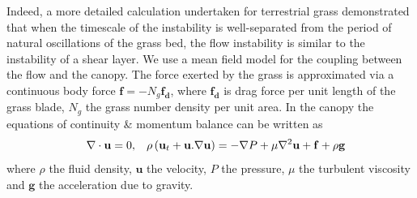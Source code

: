 \documentclass[aps,prl,twocolumn,superscriptaddress,10pt]{revtex4-1}  %
\newcommand{\bu}{\mathbf{u}}
\newcommand{\grad}{\mathbf{\nabla}}
\newcommand{\Rey}{\text{R}}
\begin{document}
Indeed, a more detailed calculation undertaken for terrestrial grass demonstrated\cite{Delangre06} that when the timescale of the instability is well-separated from the period of natural oscillations of the grass bed, 
the flow instability is similar to the instability of a shear layer. 
We use a mean field model for the coupling between the flow and the canopy. 
The force exerted by the grass is approximated via a continuous body force $\mathbf{f}=-N_g\mathbf{f_d}$,  
where $\mathbf{f_{d}}$ is drag force per unit length of the grass blade, $N_g$ the grass number density per unit area. In the canopy the equations of continuity \& momentum balance can be written as 
\begin{equation}
\quad \grad\cdot\bu = 0,\hspace{3mm} \rho \left(\bu_{t}+\bu.\grad\bu \right) = -\grad P+\mu\grad^{2}\bu +\mathbf{f}+\rho\mathbf{g}
\label{navier-stokes}
\end{equation}
where $\rho$ the fluid density, $\mathbf{u}$ the velocity, 
$P$ the pressure, $\mu$ the turbulent viscosity and $\mathbf{g}$ the acceleration due to gravity. 
\end{document}
